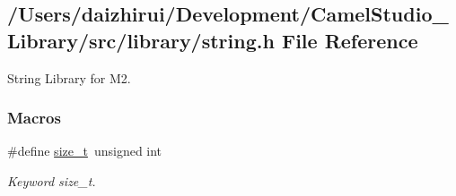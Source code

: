 \hypertarget{a00074}{}\subsection{/\+Users/daizhirui/\+Development/\+Camel\+Studio\+\_\+\+Library/src/library/string.h File Reference}
\label{a00074}


String Library for M2.  


\subsubsection*{Macros}
\begin{DoxyCompactItemize}
\item 
\mbox{\label{a00074_a43b4547e12226fef871eed8afe191ad7}} 
\#define \mbox{\hyperlink{a00074_a43b4547e12226fef871eed8afe191ad7}{size\+\_\+t}}~unsigned int
\begin{DoxyCompactList}\small\item\em Keyword size\+\_\+t. \end{DoxyCompactList}\end{DoxyCompactItemize}

